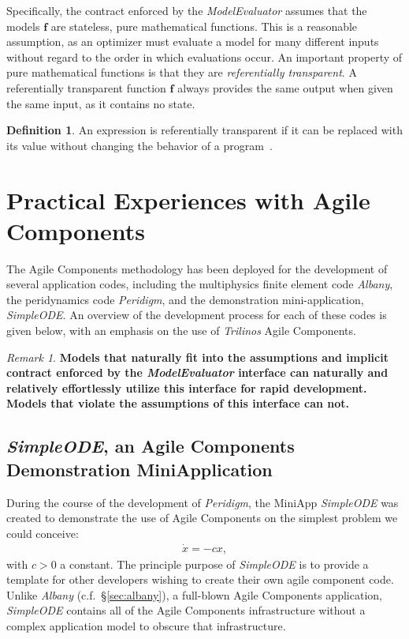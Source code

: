 \documentclass[pdf,ps2pdf,12pt,report]{SANDreport}
\theoremstyle{plain}
\theoremstyle{definition}
\newtheorem{defn}{Definition}[section]
\theoremstyle{remark}
\newtheorem{rem}{Remark}[section]
\numberwithin{equation}{section}
\begin{document}
Specifically, the contract enforced by the \emph{ModelEvaluator} assumes that the models $\mathbf{f}$ are stateless, pure mathematical functions. This is a reasonable assumption, as an optimizer must evaluate a model for many different inputs without regard to the order in which evaluations occur. An important property of pure mathematical functions is that they are \emph{referentially transparent}. A referentially transparent function $\mathbf{f}$ always provides the same output when given the same input, as it contains no state.
\begin{defn} \label{defn:RT}
An expression is referentially transparent if it can be replaced with its value without changing the behavior of a program~\cite{HGVJ:1994:DesignPatterns}.
\end{defn}

\section{Practical Experiences with Agile Components}

The Agile Components methodology has been deployed for the development of several application codes, including the multiphysics finite element code \emph{Albany}, the peridynamics code \emph{Peridigm}, and the demonstration mini-application, \emph{SimpleODE}.  An overview of the development process for each of these codes is given below, with an emphasis on the use of \emph{Trilinos} Agile Components.

\begin{rem}
\textbf{Models that naturally fit into the assumptions and implicit contract enforced by the \emph{ModelEvaluator} interface can naturally and relatively effortlessly utilize this interface for rapid development. Models that violate the assumptions of this interface can not.}
\end{rem}

\subsection{\emph{SimpleODE}, an Agile Components Demonstration MiniApplication} \label{sec:simpleode}

During the course of the development of \emph{Peridigm}, the MiniApp \emph{SimpleODE} was created to demonstrate the use of Agile Components on the simplest problem we could conceive:
\begin{align}
  \dot{x} = -c x,
\end{align}
with $c>0$ a constant. The principle purpose of \emph{SimpleODE} is to provide a template for other developers wishing to create their own agile component code. Unlike \emph{Albany} (c.f.~\S\ref{sec:albany}), a full-blown Agile Components application, \emph{SimpleODE} contains all of the Agile Components infrastructure without a complex application model to obscure that infrastructure.
\end{document}
